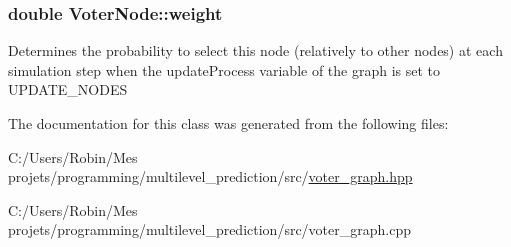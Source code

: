 \subsubsection[{weight}]{\setlength{\rightskip}{0pt plus 5cm}double Voter\+Node\+::weight}\label{class_voter_node_a06aa43e2603a2c8ee7540c754ef1fce2}
Determines the probability to select this node (relatively to other nodes) at each simulation step when the update\+Process variable of the graph is set to U\+P\+D\+A\+T\+E\+\_\+\+N\+O\+D\+E\+S 

The documentation for this class was generated from the following files\+:\begin{DoxyCompactItemize}
\item 
C\+:/\+Users/\+Robin/\+Mes projets/programming/multilevel\+\_\+prediction/src/\hyperlink{voter__graph_8hpp}{voter\+\_\+graph.\+hpp}\item 
C\+:/\+Users/\+Robin/\+Mes projets/programming/multilevel\+\_\+prediction/src/voter\+\_\+graph.\+cpp\end{DoxyCompactItemize}
